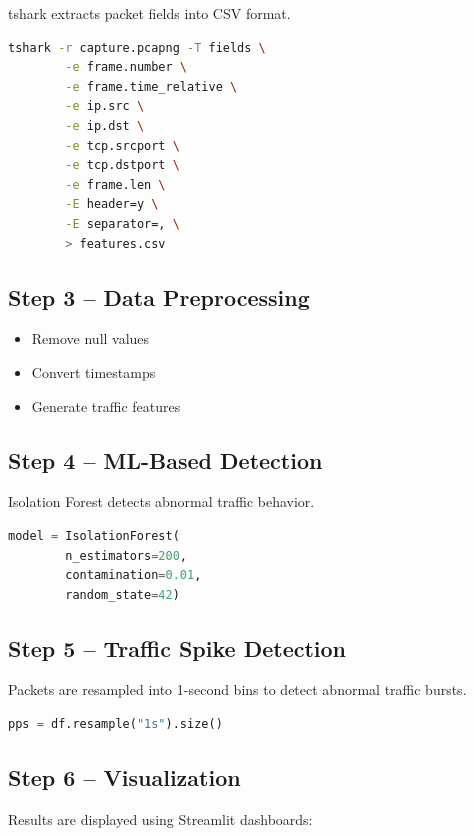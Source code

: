\documentclass[12pt,a4paper]{article}
\begin{document}
	tshark extracts packet fields into CSV format.
	
	\begin{lstlisting}[language=bash]
		tshark -r capture.pcapng -T fields \
		-e frame.number \
		-e frame.time_relative \
		-e ip.src \
		-e ip.dst \
		-e tcp.srcport \
		-e tcp.dstport \
		-e frame.len \
		-E header=y \
		-E separator=, \
		> features.csv
	\end{lstlisting}
	
	\subsection*{Step 3 -- Data Preprocessing}
	
	\begin{itemize}
		\item Remove null values
		\item Convert timestamps
		\item Generate traffic features
	\end{itemize}
	
	\subsection*{Step 4 -- ML-Based Detection}
	
	Isolation Forest detects abnormal traffic behavior.
	
	\begin{lstlisting}[language=Python]
		model = IsolationForest(
		n_estimators=200,
		contamination=0.01,
		random_state=42)
	\end{lstlisting}
	
	\subsection*{Step 5 -- Traffic Spike Detection}
	
	Packets are resampled into 1-second bins to detect abnormal traffic bursts.
	
	\begin{lstlisting}[language=Python]
		pps = df.resample("1s").size()
	\end{lstlisting}
	
	\subsection*{Step 6 -- Visualization}
	
	Results are displayed using Streamlit dashboards:
	
\end{document}
